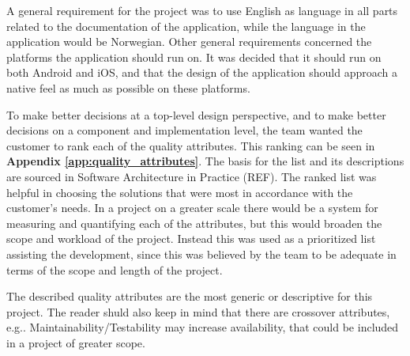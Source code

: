 A general requirement for the project was to use English as language in all parts related to the documentation of the application, while the language in the application would be Norwegian. Other general requirements concerned the platforms the application should run on. It was decided that it should run on both Android and iOS, and that the design of the application should approach a native feel as much as possible on these platforms.\newline

To make better decisions at a top-level design perspective, and to make better decisions on a component and implementation level, the team wanted the customer to rank each of the quality attributes. This ranking can be seen in \textbf{Appendix \ref{app:quality_attributes}}. The basis for the list and its descriptions are sourced in Software Architecture in Practice (REF). The ranked list was helpful in choosing the solutions that were most in accordance with the customer's needs. In a project on a greater scale there would be a system for measuring and quantifying each of the attributes, but this would broaden the scope and workload of the project. Instead this was used as a prioritized list assisting the development, since this was believed by the team to be adequate in terms of the scope and length of the project.\newline

The described quality attributes are the most generic or descriptive for this project. The reader shuld also keep in mind that there are crossover attributes, e.g.. Maintainability/Testability may increase availability, that could be included in a project of greater scope.\newline

